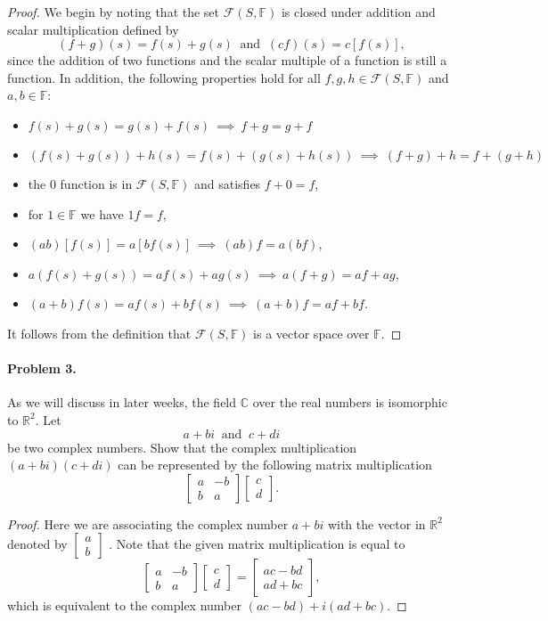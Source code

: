 \documentclass{article}
\begin{document}
\begin{proof}
We begin by noting that the set $\mathcal{F}(S,\mathbb{F})$ is closed under addition and scalar multiplication defined by
\[
(f+g)(s)=f(s)+g(s)~\text{ and }~(cf)(s)=c[f(s)],
\]
since the addition of two functions and the scalar multiple of a function is still a function. In addition, the following properties hold for all $f,g,h\in\mathcal{F}(S,\mathbb{F})$ and $a,b\in\mathbb{F}$:
\begin{itemize}
\item	$f(s)+g(s)=g(s)+f(s)~\implies~f+g=g+f$
\item	$(f(s)+g(s))+h(s)=f(s)+(g(s)+h(s))~\implies~(f+g)+h=f+(g+h)$
\item	the $0$ function is in $\mathcal{F}(S,\mathbb{F})$ and satisfies $f+0=f$,
\item	for $1\in\mathbb{F}$ we have $1f=f$,
\item	$(ab)[f(s)]=a[bf(s)]~\implies~(ab)f=a(bf)$,
\item	$a(f(s)+g(s))=af(s)+ag(s)~\implies~a(f+g)=af+ag$,
\item	$(a+b)f(s)=af(s)+bf(s)~\implies~(a+b)f=af+bf$.
\end{itemize}
It follows from the definition that $\mathcal{F}(S,\mathbb{F})$ is a vector space over $\mathbb{F}$. 
\end{proof}

\paragraph*{Problem 3.}	As we will discuss in later weeks, the field $\mathbb{C}$ over the real numbers is isomorphic to $\mathbb{R}^{2}$. Let 
\[
a+bi~\text{ and }~c+di
\]
be two complex numbers. Show that the complex multiplication $(a+bi)(c+di)$ can be represented by the following matrix multiplication
\[
\begin{bmatrix}a & -b\\b & a\end{bmatrix}\begin{bmatrix}c \\ d\end{bmatrix}.
\]

\begin{proof}
Here we are associating the complex number $a+bi$ with the vector in $\mathbb{R}^{2}$ denoted by $\begin{bmatrix}a\\b\end{bmatrix}$ . Note that the given matrix multiplication is equal to 
\[
\begin{bmatrix}a & -b\\b & a\end{bmatrix}\begin{bmatrix}c\\d\end{bmatrix}=\begin{bmatrix}ac-bd\\ad+bc\end{bmatrix},
\]
which is equivalent to the complex number $(ac-bd)+i(ad+bc)$.
\end{proof}
\end{document}
